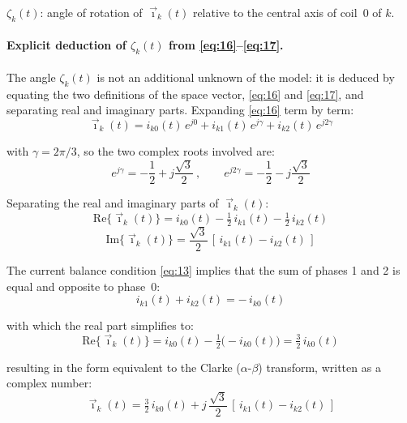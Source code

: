 \documentclass[11pt,a4paper]{article}
\begin{document}
$\zeta_k(t)$: angle of rotation of $\vec\imath_k(t)$ relative to the central axis of coil~0 of $k$.

\paragraph{Explicit deduction of $\zeta_k(t)$ from \eqref{eq:16}--\eqref{eq:17}.}

The angle $\zeta_k(t)$ is not an additional unknown of the model: it is deduced by equating the two definitions of the space vector, \eqref{eq:16} and \eqref{eq:17}, and separating real and imaginary parts. Expanding \eqref{eq:16} term by term:
\begin{equation}\tag{18}\label{eq:18}
\vec\imath_k(t) = i_{k0}(t)\,e^{j0} + i_{k1}(t)\,e^{j\gamma} + i_{k2}(t)\,e^{j2\gamma}
\end{equation}

with $\gamma=2\pi/3$, so the two complex roots involved are:
\begin{equation}\tag{19}\label{eq:19}
e^{j\gamma} = -\frac12 + j\frac{\sqrt3}{2}\ ,\qquad e^{j2\gamma} = -\frac12 - j\frac{\sqrt3}{2}
\end{equation}

Separating the real and imaginary parts of $\vec\imath_k(t)$:
\begin{equation}\tag{20}\label{eq:20}
\mathrm{Re}\{\vec\imath_k(t)\} = i_{k0}(t) - \tfrac12\, i_{k1}(t) - \tfrac12\, i_{k2}(t)
\end{equation}
\begin{equation}\tag{21}\label{eq:21}
\mathrm{Im}\{\vec\imath_k(t)\} = \frac{\sqrt3}{2}\,[\,i_{k1}(t) - i_{k2}(t)\,]
\end{equation}

The current balance condition \eqref{eq:13} implies that the sum of phases 1 and 2 is equal and opposite to phase~0:
\begin{equation}\tag{22}\label{eq:22}
i_{k1}(t) + i_{k2}(t) = -\,i_{k0}(t)
\end{equation}

with which the real part simplifies to:
\begin{equation}\tag{23}\label{eq:23}
\mathrm{Re}\{\vec\imath_k(t)\} = i_{k0}(t) - \tfrac12\bigl(-i_{k0}(t)\bigr) = \tfrac32\, i_{k0}(t)
\end{equation}

resulting in the form equivalent to the Clarke ($\alpha$-$\beta$) transform, written as a complex number:
\begin{equation}\tag{24}\label{eq:24}
\vec\imath_k(t) = \tfrac32\, i_{k0}(t) + j\,\frac{\sqrt3}{2}\,[\,i_{k1}(t) - i_{k2}(t)\,]
\end{equation}
\end{document}
